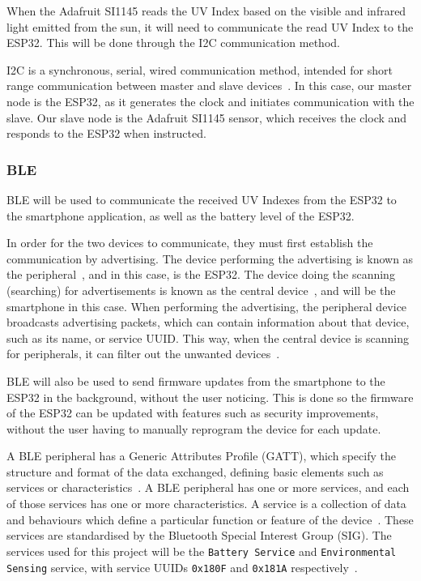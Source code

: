 \documentclass[12pt,openany,a4paper]{book}
\begin{document}
When the Adafruit SI1145 reads the UV Index based on the visible and infrared
light emitted from the sun, it will need to communicate the read UV Index to the
ESP32. This will be done through the I2C communication method.

I2C is a
synchronous, serial, wired communication method, intended for short range
communication between master and slave devices~\cite{sparkfun}. In this case, our
master node is the ESP32, as it generates the clock and initiates communication
with the slave. Our slave node is the Adafruit SI1145 sensor, which receives the
clock and responds to the ESP32 when instructed.

\subsubsection{BLE}

BLE will be used to communicate the received UV Indexes from the ESP32 to the
smartphone application, as well as the battery level of the ESP32.

In order for
the two devices to communicate, they must first establish the communication by
advertising. The device performing the advertising is known as the
peripheral~\cite{woolley_2016}, and in this case, is the ESP32. The device doing
the scanning (searching) for advertisements is known as the central device~\cite{woolley_2016}, and
will be the smartphone in this case. When performing the advertising, the
peripheral device broadcasts advertising packets, which can contain information about
that device, such as its name, or service UUID. This way, when the central
device is scanning for peripherals, it can filter out the unwanted
devices~\cite{argenox}.

BLE will also be used to send firmware updates from the smartphone to the ESP32
in the background, without the user noticing. This
is done so the firmware of the ESP32 can be updated with features such as
security improvements, without the user having to manually reprogram the device
for each update.

A BLE peripheral has a Generic Attributes Profile (GATT), which
specify the structure and format of the data exchanged, defining basic elements
such as services or characteristics~\cite{martinbl}. A BLE peripheral has one or more
services, and each of those services has one or more characteristics. A service
is a collection of data and behaviours which define a particular function or
feature of the device~\cite{martinbl}. These services are standardised by the
Bluetooth Special Interest Group (SIG). The services used for this project will
be the \verb|Battery Service| and \verb|Environmental Sensing| service, with service UUIDs
\verb|0x180F| and \verb|0x181A| respectively~\cite{bluetooth_gatt}.
\end{document}
